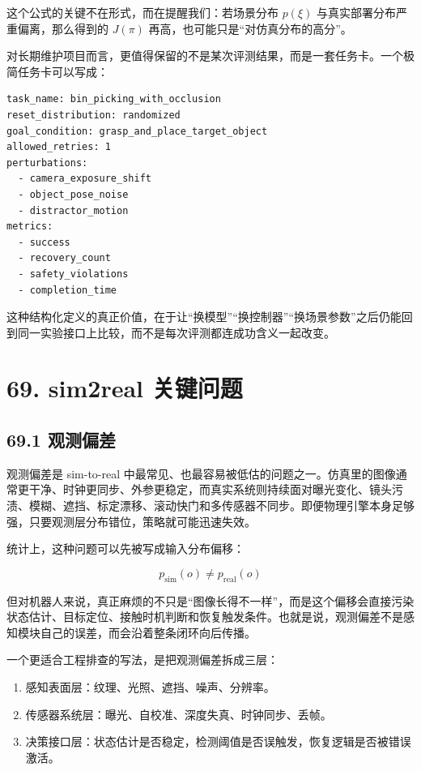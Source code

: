 这个公式的关键不在形式，而在提醒我们：若场景分布 \(p(\xi)\) 与真实部署分布严重偏离，那么得到的 \(J(\pi)\) 再高，也可能只是“对仿真分布的高分”。

对长期维护项目而言，更值得保留的不是某次评测结果，而是一套任务卡。一个极简任务卡可以写成：

\begin{lstlisting}
task_name: bin_picking_with_occlusion
reset_distribution: randomized
goal_condition: grasp_and_place_target_object
allowed_retries: 1
perturbations:
  - camera_exposure_shift
  - object_pose_noise
  - distractor_motion
metrics:
  - success
  - recovery_count
  - safety_violations
  - completion_time
\end{lstlisting}

这种结构化定义的真正价值，在于让“换模型”“换控制器”“换场景参数”之后仍能回到同一实验接口上比较，而不是每次评测都连成功含义一起改变。

\section*{69. sim2real 关键问题}

\subsection*{69.1 观测偏差}


观测偏差是 sim-to-real 中最常见、也最容易被低估的问题之一。仿真里的图像通常更干净、时钟更同步、外参更稳定，而真实系统则持续面对曝光变化、镜头污渍、模糊、遮挡、标定漂移、滚动快门和多传感器不同步。即便物理引擎本身足够强，只要观测层分布错位，策略就可能迅速失效。

统计上，这种问题可以先被写成输入分布偏移：

\begin{equation*}
p_{\text{sim}}(o) \neq p_{\text{real}}(o)
\end{equation*}

但对机器人来说，真正麻烦的不只是“图像长得不一样”，而是这个偏移会直接污染状态估计、目标定位、接触时机判断和恢复触发条件。也就是说，观测偏差不是感知模块自己的误差，而会沿着整条闭环向后传播。

一个更适合工程排查的写法，是把观测偏差拆成三层：

\begin{enumerate}
\item 感知表面层：纹理、光照、遮挡、噪声、分辨率。
\item 传感器系统层：曝光、自校准、深度失真、时钟同步、丢帧。
\item 决策接口层：状态估计是否稳定，检测阈值是否误触发，恢复逻辑是否被错误激活。
\end{enumerate}

